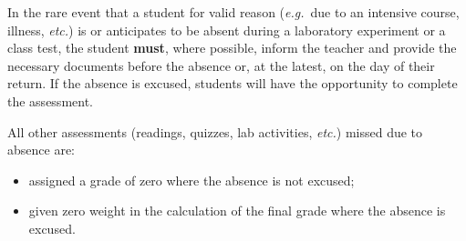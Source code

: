 \entry{\mbox{ }}
{In the rare event that a student for valid reason (\textit{e.g.}~due to an intensive course, illness, \textit{etc.}) is or anticipates to be absent during a laboratory experiment or a class test, the student \textbf{must}, where possible, inform the teacher and provide the necessary documents before the absence or, at the latest, on the day of their return.  If the absence is excused, students will have the opportunity to complete the assessment.
\smallskip

All other assessments (readings, quizzes, lab activities, \textit{etc.}) missed due to absence are:
\begin{itemize}
	\item assigned a grade of zero where the absence is not excused;
	\item given zero weight in the calculation of the final grade where the absence is excused.
\end{itemize}
}
